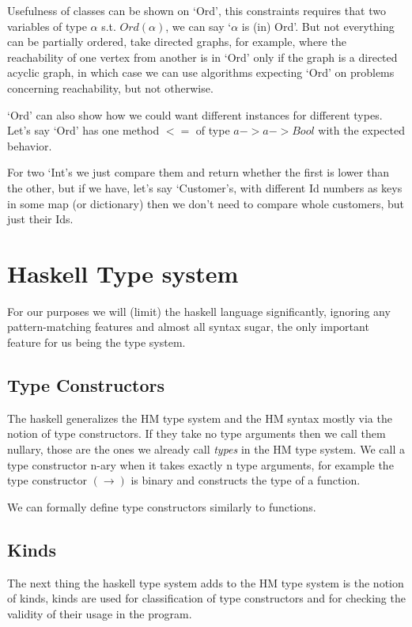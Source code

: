 Usefulness of classes can be shown on `Ord', this constraints requires that two variables of type $\alpha$ s.t. $Ord(\alpha)$, we can say `$\alpha$ is (in) Ord'. But not everything can be partially ordered, take directed graphs, for example, where the reachability of one vertex from another is in `Ord' only if the graph is a directed acyclic graph, in which case we can use algorithms expecting `Ord' on problems concerning reachability, but not otherwise.

`Ord' can also show how we could want different instances for different types. Let's say `Ord' has one method $<=$ of type $a -> a -> Bool$ with the expected behavior. %

For two `Int's we just compare them and return whether the first is lower than the other, but if we have, let's say `Customer's, with different Id numbers as keys in some map (or dictionary) then we don't need to compare whole customers, but just their Ids.

\section{Haskell Type system}

For our purposes we will (limit) the haskell language significantly, ignoring any pattern-matching features and almost all syntax sugar, the only important feature for us being the type system. %

\subsection{Type Constructors}

The haskell generalizes the HM type system and the HM syntax mostly via the notion of type constructors. If they take no type arguments then we call them nullary, those are the ones we already call \emph{types} in the HM type system. We call a type constructor n-ary when it takes exactly n type arguments, for example the type constructor $(\rightarrow)$ is binary and constructs the type of a function. %

We can formally define type constructors similarly to functions.

\subsection{Kinds}

The next thing the haskell type system adds to the HM type system is the notion of kinds, kinds are used for classification of type constructors and for checking the validity of their usage in the program.

